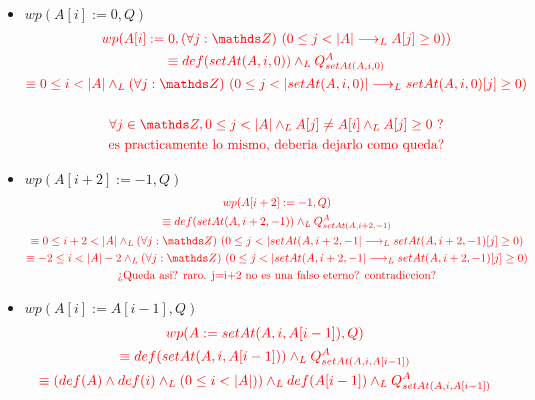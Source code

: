 \documentclass[10pt,a4paper]{article}
\begin{document}
\begin{itemize}
    \item $wp(A[i]:=0,Q)$
    \begin{equation*}
        \color{red}
        \begin{gathered}
            wp(A[i]:=0,\paraTodo[unalinea]{j}{\ent}{0\leq j < |A| \implicaLuego A[j]\geq 0})\\
            \equiv def(setAt(A,i,0)) \yLuego Q_{setAt(A,i,0)}^A\\
            \equiv 0\leq i < |A| \yLuego \paraTodo[unalinea]{j}{\ent}{0\leq j < |setAt(A,i,0)| \implicaLuego setAt(A,i,0)[j]\geq 0}\\
            \\
            \forall j \in \ent,0\leq j <|A|\yLuego A[j]\not= A[i] \yLuego A[j]\geq 0\ ?
            \\\text{es practicamente lo mismo, deberia dejarlo como queda?}
        \end{gathered}
    \end{equation*}
    \item $wp(A[i+2]:=-1,Q)$
    \begin{equation*}
        \color{red}
        \begin{gathered}
            wp(A[i+2]:=-1,Q)\\
            \equiv def(setAt(A,i+2,-1))\yLuego Q_{setAt(A,i+2,-1)}^A\\
            \equiv 0\leq i+2 < |A| \yLuego \paraTodo[unalinea]{j}{\ent}{0\leq j < |setAt(A,i+2,-1| \implicaLuego setAt(A,i+2,-1)[j]\geq 0}\\
            \equiv -2\leq i < |A|-2 \yLuego \paraTodo[unalinea]{j}{\ent}{0\leq j < |setAt(A,i+2,-1| \implicaLuego setAt(A,i+2,-1)[j]\geq 0}
            \\\text{¿Queda asi? raro. j=i+2 no es una falso eterno? contradiccion?}
        \end{gathered}
    \end{equation*}
    \item $wp(A[i]:=A[i-1],Q)$
    \begin{equation*}
        \color{red}
        \begin{gathered}
            wp(A:=setAt(A,i,A[i-1]),Q)\\
            \equiv def(setAt(A,i,A[i-1]))\yLuego Q_{setAt(A,i,A[i-1])}^A\\
            \equiv (def(A)\land def(i)\yLuego (0\leq i < |A|))\yLuego def(A[i-1])\yLuego Q_{setAt(A,i,A[i-1])}^A\\

\end{gathered}
\end{equation*}
\end{itemize}
\end{document}
